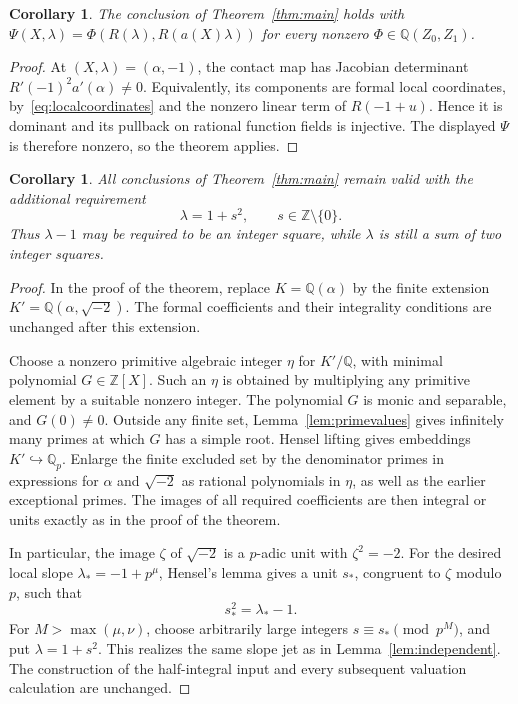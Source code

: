 \documentclass[11pt,a4paper]{article}
\newtheorem{corollary}[theorem]{Corollary}
\theoremstyle{remark}\newtheorem{remark}[theorem]{Remark}
\newcommand{\Q}{\mathbb Q}\newcommand{\Z}{\mathbb Z}
\begin{document}
\begin{corollary}\label{cor:combination}
The conclusion of Theorem~\ref{thm:main} holds with
\(\Psi(X,\lambda)=\Phi(R(\lambda),R(a(X)\lambda))\)
for every nonzero \(\Phi\in\Q(Z_0,Z_1)\).
\end{corollary}

\begin{proof}
At \((X,\lambda)=(\alpha,-1)\), the contact map has Jacobian
determinant \(R'(-1)^2a'(\alpha)\ne0\).
Equivalently, its components are formal local coordinates,
by~\eqref{eq:localcoordinates} and the nonzero linear term
of \(R(-1+u)\). Hence it is dominant and its pullback on
rational function fields is injective. The displayed
\(\Psi\) is therefore nonzero, so the theorem applies.
\end{proof}

\begin{corollary}\label{cor:squarenorm}
All conclusions of Theorem~\ref{thm:main} remain valid with
the additional requirement
\[
                       \lambda=1+s^2,\qquad
                       s\in\Z\setminus\{0\}.
\]
Thus \(\lambda-1\) may be required to be an integer square,
while \(\lambda\) is still a sum of two integer squares.
\end{corollary}

\begin{proof}
In the proof of the theorem, replace \(K=\Q(\alpha)\) by
the finite extension \(K'=\Q(\alpha,\sqrt{-2})\).
The formal coefficients and their integrality conditions are
unchanged after this extension.

Choose a nonzero primitive algebraic integer \(\eta\) for
\(K'/\Q\), with minimal polynomial \(G\in\Z[X]\).
Such an \(\eta\) is obtained by multiplying any primitive
element by a suitable nonzero integer.
The polynomial \(G\) is monic and separable, and \(G(0)\ne0\).
Outside any finite set, Lemma~\ref{lem:primevalues} gives
infinitely many primes at which \(G\) has a simple root.
Hensel lifting gives embeddings \(K'\hookrightarrow\Q_p\).
Enlarge the finite excluded set by the denominator primes
in expressions for \(\alpha\) and \(\sqrt{-2}\) as rational
polynomials in \(\eta\), as well as the earlier exceptional
primes. The images of all required coefficients are then
integral or units exactly as in the proof of the theorem.

In particular, the image \(\zeta\) of \(\sqrt{-2}\) is a
\(p\)-adic unit with \(\zeta^2=-2\).
For the desired local slope \(\lambda_*=-1+p^\mu\),
Hensel's lemma gives a unit \(s_*\), congruent to \(\zeta\)
modulo \(p\), such that
\[
                          s_*^2=\lambda_*-1.
\]
For \(M>\max(\mu,\nu)\), choose arbitrarily large integers
\(s\equiv s_*\pmod{p^M}\), and put \(\lambda=1+s^2\).
This realizes the same slope jet as in
Lemma~\ref{lem:independent}. The construction of the
half-integral input and every subsequent valuation calculation
are unchanged.
\end{proof}
\end{document}
